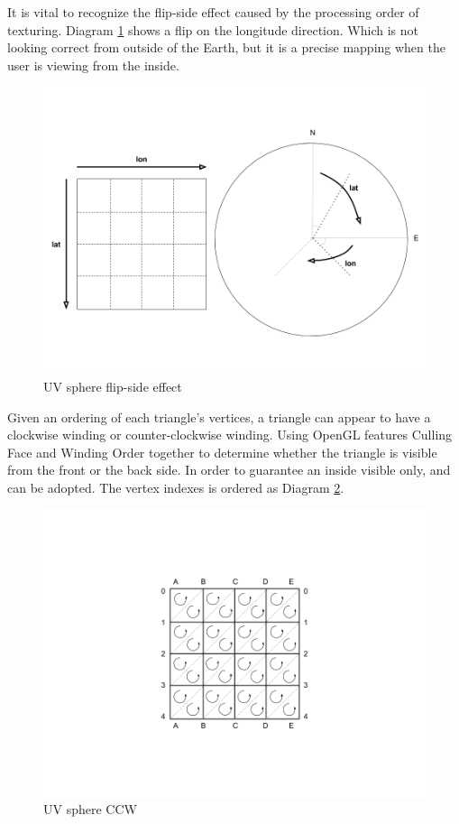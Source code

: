 It is vital to recognize the flip-side effect caused by the processing order of texturing. Diagram \ref{fig:uv-sphere-flip-side} shows a flip on the longitude direction. Which is not looking correct from outside of the Earth, but it is a precise mapping when the user is viewing from the inside.
 
\begin{figure}[H]
	\caption{UV sphere flip-side effect}
	\label{fig:uv-sphere-flip-side}
	\centering
	\includegraphics[width=\linewidth]{Figures/uv-sphere-flip-side.png}
	\decoRule
\end{figure}

Given an ordering of each triangle's vertices, a triangle can appear to have a clockwise winding or counter-clockwise winding. Using OpenGL features Culling Face and Winding Order together to determine whether the triangle is visible from the front or the back side. In order to guarantee an inside visible only,  and  can be adopted. The vertex indexes is ordered as Diagram \ref{fig:uv-sphere-ccw}.

\begin{figure}[H]
	\caption{UV sphere CCW}
	\label{fig:uv-sphere-ccw}
	\centering
	\includegraphics[width=\linewidth]{Figures/uv-sphere-ccw.png}
	\decoRule
\end{figure}

